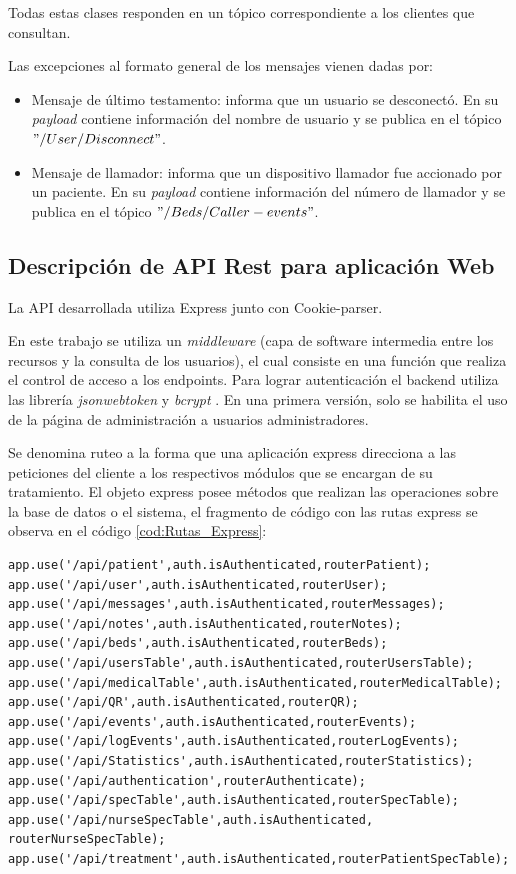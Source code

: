 Todas estas clases responden en un tópico correspondiente a los clientes que consultan.

Las excepciones al formato general de los mensajes vienen dadas por:
\begin{itemize}
\item Mensaje de último testamento: informa que un usuario se desconectó. En su \textit{payload} contiene información del nombre de usuario y se publica en el tópico $"/User/Disconnect"$.
\item Mensaje de llamador: informa que un dispositivo llamador fue accionado por un paciente. En su \textit{payload} contiene información del número de llamador y se publica en el tópico $"/Beds/Caller-events"$.

\end{itemize}


\pagebreak

\subsection{Descripción de API Rest para aplicación Web}

La API desarrollada utiliza Express junto con Cookie-parser. 
 
En este trabajo se utiliza un \textit{middleware} (capa de software intermedia entre los recursos y la consulta de los usuarios), el cual consiste en una función que realiza el control de acceso a los endpoints. Para lograr autenticación el backend utiliza las librería \textit{jsonwebtoken} \citep{WEBSITE:32} y \textit{bcrypt} \citep{WEBSITE:31}. En una primera versión, solo se habilita el uso de la página de administración a usuarios administradores.

Se denomina ruteo a la forma que una aplicación express direcciona a las peticiones del cliente a los respectivos módulos que se encargan de su tratamiento.%
El objeto express posee métodos que realizan las operaciones sobre la base de datos o el sistema, el fragmento de código con las rutas express se observa en el código \ref{cod:Rutas_Express}:

\begin{lstlisting}[label=cod:Rutas_Express,caption=  Rutas express]
app.use('/api/patient',auth.isAuthenticated,routerPatient);
app.use('/api/user',auth.isAuthenticated,routerUser);
app.use('/api/messages',auth.isAuthenticated,routerMessages);
app.use('/api/notes',auth.isAuthenticated,routerNotes);
app.use('/api/beds',auth.isAuthenticated,routerBeds);
app.use('/api/usersTable',auth.isAuthenticated,routerUsersTable);
app.use('/api/medicalTable',auth.isAuthenticated,routerMedicalTable);
app.use('/api/QR',auth.isAuthenticated,routerQR);
app.use('/api/events',auth.isAuthenticated,routerEvents);
app.use('/api/logEvents',auth.isAuthenticated,routerLogEvents);
app.use('/api/Statistics',auth.isAuthenticated,routerStatistics);
app.use('/api/authentication',routerAuthenticate);
app.use('/api/specTable',auth.isAuthenticated,routerSpecTable);
app.use('/api/nurseSpecTable',auth.isAuthenticated,  routerNurseSpecTable);
app.use('/api/treatment',auth.isAuthenticated,routerPatientSpecTable);
\end{lstlisting}

